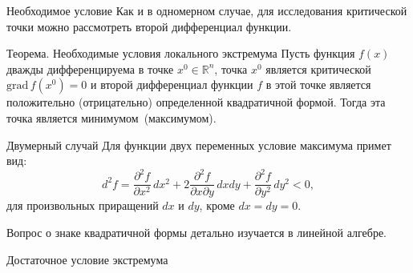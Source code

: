 \documentclass[8pt]{beamer}
\newcommand{\grad}{\mathrm{grad\,}}
\newcommand{\pp}[2]{\frac{\partial #1}{\partial #2}}
\begin{document}
\begin{frame}{Необходимое условие}
Как и в одномерном случае, для исследования критической точки можно рассмотреть второй дифференциал функции.
\begin{block}{Теорема. Необходимые условия локального экстремума}
Пусть функция $f(x)$ дважды дифференцируема в точке $x^0\in\mathbb{R}^n$, точка $x^0$ является критической $\grad f(x^0)=0$ и второй дифференциал функции $f$ в этой точке является положительно (отрицательно) определенной квадратичной формой. Тогда эта точка является минимумом~(максимумом).
\end{block}

\begin{block}{Двумерный случай}
Для функции двух переменных условие максимума примет вид:
$$d^2 f = \frac{\partial^2 f}{\partial x^2}\,dx^2+2 \frac{\partial^2 f}{\partial x \partial y}\,dx dy+\frac{\partial^2 f}{\partial y^2}\,dy^2<0,$$
для произвольных приращений $dx$ и $dy$, кроме $dx=dy=0$.
\end{block}

Вопрос о знаке квадратичной формы детально изучается в линейной алгебре.
\end{frame}

\begin{frame}{Достаточное условие экстремума}
\end{frame}
\end{document}
